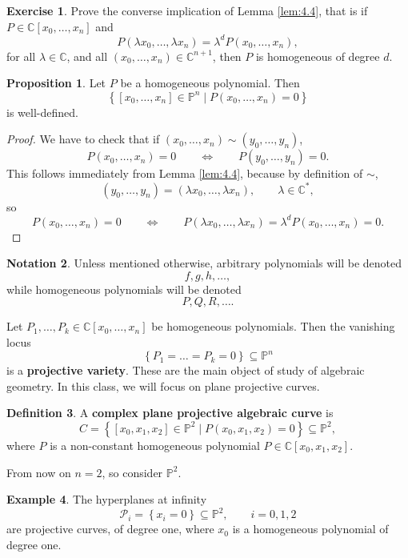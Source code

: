\documentclass{article}
\newcommand{\C}{\mathbb{C}}
\renewcommand{\P}{\mathbb{P}}
\newcommand{\rb}[1]{\left( #1 \right)}
\renewcommand{\sb}[1]{\left[ #1 \right]}
\newcommand{\cb}[1]{\left\{ #1 \right\}}
\theoremstyle{definition}\newtheorem{definition}{Definition}[section]
\theoremstyle{definition}\newtheorem{notation}[definition]{Notation}
\theoremstyle{definition}\newtheorem{remark}[definition]{Remark}
\theoremstyle{definition}\newtheorem{example1}[definition]{Example}
\theoremstyle{definition}\newtheorem{fact}{Fact}
\theoremstyle{definition}\newtheorem{exercise}{Exercise}
\theoremstyle{definition}\newtheorem*{example2}{Example}
\newtheorem{proposition}[definition]{Proposition}
\begin{document}
\begin{exercise}
Prove the converse implication of Lemma \ref{lem:4.4}, that is if $ P \in \C\sb{x_0, \dots, x_n} $ and
$$ P\rb{\lambda x_0, \dots, \lambda x_n} = \lambda^dP\rb{x_0, \dots, x_n}, $$
for all $ \lambda \in \C $, and all $ \rb{x_0, \dots, x_n} \in \C^{n + 1} $, then $ P $ is homogeneous of degree $ d $.
\end{exercise}

\begin{proposition}
Let $ P $ be a homogeneous polynomial. Then
$$ \cb{\sb{x_0, \dots, x_n} \in \P^n \mid P\rb{x_0, \dots, x_n} = 0} $$
is well-defined.
\end{proposition}

\begin{proof}
We have to check that if $ \rb{x_0, \dots, x_n} \sim \rb{y_0, \dots, y_n} $,
$$ P\rb{x_0, \dots, x_n} = 0 \qquad \iff \qquad P\rb{y_0, \dots, y_n} = 0. $$
This follows immediately from Lemma \ref{lem:4.4}, because by definition of $ \sim $,
$$ \rb{y_0, \dots, y_n} = \rb{\lambda x_0, \dots, \lambda x_n}, \qquad \lambda \in \C^*, $$
so
$$ P\rb{x_0, \dots, x_n} = 0 \qquad \iff \qquad P\rb{\lambda x_0, \dots, \lambda x_n} = \lambda^dP\rb{x_0, \dots, x_n} = 0. $$
\end{proof}

\begin{notation}
Unless mentioned otherwise, arbitrary polynomials will be denoted
$$ f, g, h, \dots, $$
while homogeneous polynomials will be denoted
$$ P, Q, R, \dots. $$
\end{notation}

Let $ P_1, \dots, P_k \in \C\sb{x_0, \dots, x_n} $ be homogeneous polynomials. Then the vanishing locus
$$ \cb{P_1 = \dots = P_k = 0} \subseteq \P^n $$
is a \textbf{projective variety}. These are the main object of study of algebraic geometry. In this class, we will focus on plane projective curves.

\begin{definition}
A \textbf{complex plane projective algebraic curve} is
$$ C = \cb{\sb{x_0, x_1, x_2} \in \P^2 \mid P\rb{x_0, x_1, x_2} = 0} \subseteq \P^2, $$
where $ P $ is a non-constant homogeneous polynomial $ P \in \C\sb{x_0, x_1, x_2} $.
\end{definition}

From now on $ n = 2 $, so consider $ \P^2 $.

\begin{example1}
The hyperplanes at infinity
$$ \mathcal{P}_i = \cb{x_i = 0} \subseteq \P^2, \qquad i = 0, 1, 2 $$
are projective curves, of degree one, where $ x_0 $ is a homogeneous polynomial of degree one.
\end{example1}
\end{document}
